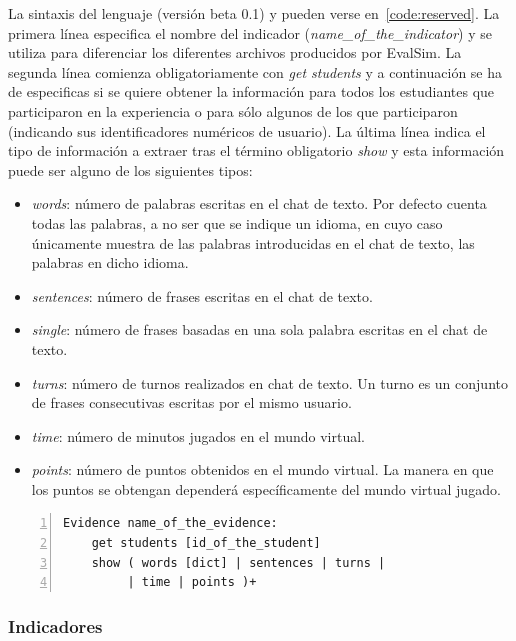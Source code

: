 La sintaxis del lenguaje (versión beta 0.1) y pueden verse en~\ref{code:reserved}. La primera línea especifica el nombre del indicador (\emph{name\_of\_the\_indicator}) y se utiliza para diferenciar los diferentes archivos producidos por EvalSim. La segunda línea comienza obligatoriamente con \emph{get students} y a continuación se ha de especificas si se quiere obtener la información para todos los estudiantes que participaron en la experiencia o para sólo algunos de los que participaron (indicando sus identificadores numéricos de usuario). La última línea indica el tipo de información a extraer tras el término obligatorio \emph{show} y esta información puede ser alguno de los siguientes tipos:

\begin{itemize}
\item \emph{words}: número de palabras escritas en el chat de texto. Por defecto cuenta todas las palabras, a no ser que se indique un idioma, en cuyo caso únicamente muestra de las palabras introducidas en el chat de texto, las palabras en dicho idioma.
\item \emph{sentences}: número de frases escritas en el chat de texto.
\item \emph{single}: número de frases basadas en una sola palabra escritas en el chat de texto.
\item \emph{turns}: número de turnos realizados en chat de texto. Un turno es un conjunto de frases consecutivas escritas por el mismo usuario.
\item \emph{time}: número de minutos jugados en el mundo virtual.
\item \emph{points}: número de puntos obtenidos en el mundo virtual. La manera en que los puntos se obtengan dependerá específicamente del mundo virtual jugado.
\end{itemize}

\begin{lstlisting}[caption=Palabras reservadas y formato de VWQL (version 0.1), label=code:reserved,numbers=left, captionpos=b, morekeywords={Evidence,get, students, show, words, sentences, turns, time, points}]
Evidence name_of_the_evidence:
    get students [id_of_the_student]
    show ( words [dict] | sentences | turns |
         | time | points )+
\end{lstlisting}

\subsubsection{Indicadores}

